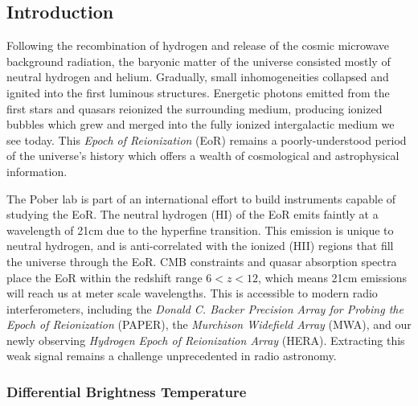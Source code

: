 \documentclass[a0,landscape]{a0poster}
\begin{document}
\begin{multicols}{4}

\color{DarkSlateGray}  %

\section*{Introduction}
Following the recombination of hydrogen and release of the cosmic microwave background radiation, the baryonic matter of the universe consisted mostly of neutral hydrogen and helium. Gradually, small inhomogeneities collapsed and ignited into the first luminous structures. Energetic photons emitted from the first stars and quasars reionized the surrounding medium, producing ionized bubbles which grew and merged into the fully ionized intergalactic medium we see today. This \emph{Epoch of Reionization} (EoR) remains a poorly-understood period of the universe's history which offers a wealth of cosmological and astrophysical information.

The Pober lab is part of an international effort to build instruments capable of studying the EoR. The neutral hydrogen (HI) of the EoR emits faintly at a wavelength of 21cm due to the hyperfine transition. This emission is unique to neutral hydrogen, and is anti-correlated with the ionized (HII) regions that fill the universe through the EoR. CMB constraints and quasar absorption spectra place the EoR within the redshift range $6 < z < 12$, which means 21cm emissions will reach us at meter scale wavelengths. This is accessible to modern radio interferometers, including the \emph{Donald C. Backer Precision Array for Probing the Epoch of Reionization} (PAPER), the \emph{Murchison Widefield Array} (MWA), and our newly observing \emph{Hydrogen Epoch of Reionization Array} (HERA). Extracting this weak signal remains a challenge unprecedented in radio astronomy.



\subsubsection*{Differential Brightness Temperature}



\end{multicols}
\end{document}
